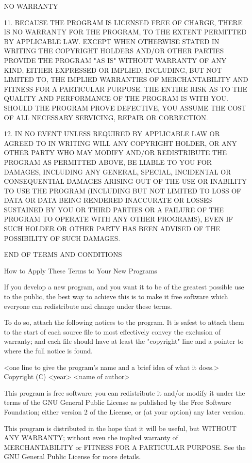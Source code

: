 \documentclass{doc}
\begin{document}
			    NO WARRANTY

  11. BECAUSE THE PROGRAM IS LICENSED FREE OF CHARGE, THERE IS NO WARRANTY
FOR THE PROGRAM, TO THE EXTENT PERMITTED BY APPLICABLE LAW.  EXCEPT WHEN
OTHERWISE STATED IN WRITING THE COPYRIGHT HOLDERS AND/OR OTHER PARTIES
PROVIDE THE PROGRAM "AS IS" WITHOUT WARRANTY OF ANY KIND, EITHER EXPRESSED
OR IMPLIED, INCLUDING, BUT NOT LIMITED TO, THE IMPLIED WARRANTIES OF
MERCHANTABILITY AND FITNESS FOR A PARTICULAR PURPOSE.  THE ENTIRE RISK AS
TO THE QUALITY AND PERFORMANCE OF THE PROGRAM IS WITH YOU.  SHOULD THE
PROGRAM PROVE DEFECTIVE, YOU ASSUME THE COST OF ALL NECESSARY SERVICING,
REPAIR OR CORRECTION.

  12. IN NO EVENT UNLESS REQUIRED BY APPLICABLE LAW OR AGREED TO IN WRITING
WILL ANY COPYRIGHT HOLDER, OR ANY OTHER PARTY WHO MAY MODIFY AND/OR
REDISTRIBUTE THE PROGRAM AS PERMITTED ABOVE, BE LIABLE TO YOU FOR DAMAGES,
INCLUDING ANY GENERAL, SPECIAL, INCIDENTAL OR CONSEQUENTIAL DAMAGES ARISING
OUT OF THE USE OR INABILITY TO USE THE PROGRAM (INCLUDING BUT NOT LIMITED
TO LOSS OF DATA OR DATA BEING RENDERED INACCURATE OR LOSSES SUSTAINED BY
YOU OR THIRD PARTIES OR A FAILURE OF THE PROGRAM TO OPERATE WITH ANY OTHER
PROGRAMS), EVEN IF SUCH HOLDER OR OTHER PARTY HAS BEEN ADVISED OF THE
POSSIBILITY OF SUCH DAMAGES.

		     END OF TERMS AND CONDITIONS

	    How to Apply These Terms to Your New Programs

  If you develop a new program, and you want it to be of the greatest
possible use to the public, the best way to achieve this is to make it
free software which everyone can redistribute and change under these terms.

  To do so, attach the following notices to the program.  It is safest
to attach them to the start of each source file to most effectively
convey the exclusion of warranty; and each file should have at least
the "copyright" line and a pointer to where the full notice is found.

    <one line to give the program's name and a brief idea of what it does.>
    Copyright (C) <year>  <name of author>

    This program is free software; you can redistribute it and/or modify
    it under the terms of the GNU General Public License as published by
    the Free Software Foundation; either version 2 of the License, or
    (at your option) any later version.

    This program is distributed in the hope that it will be useful,
    but WITHOUT ANY WARRANTY; without even the implied warranty of
    MERCHANTABILITY or FITNESS FOR A PARTICULAR PURPOSE.  See the
    GNU General Public License for more details.
\end{document}
